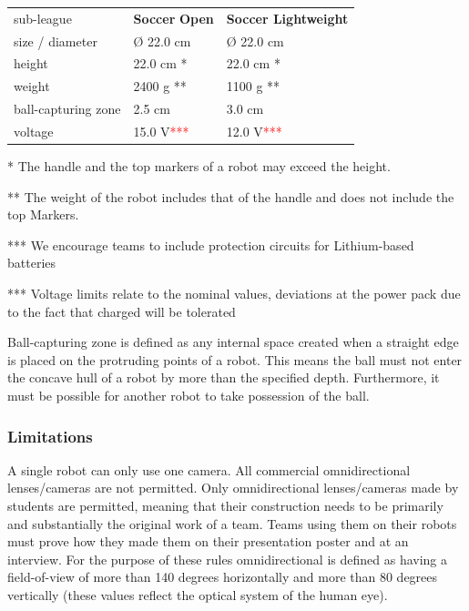 \documentclass{article}
\begin{document}
\begin{table}
\begin{tabularx}{\textwidth}{
p{}
p{}
p{}}
sub-league & \textbf{Soccer} \textbf{Open} & \textbf{Soccer Lightweight} \\
size / diameter & \O{} 22.0 cm & \O{} 22.0 cm \\
height & 22.0 cm * & 22.0 cm * \\
weight & 2400 g ** & 1100 g ** \\
ball-capturing zone & 2.5 cm & 3.0 cm \\
voltage & 15.0 V\textcolor{red}{***} & 12.0 V\textcolor{red}{***} \\

\end{tabularx}

\end{table}

* The handle and the top markers of a robot may exceed the height.

** The weight of the robot includes that of the handle and does not include the top Markers.

*** We encourage teams to include protection circuits for Lithium-based
batteries

*** Voltage limits relate to the nominal values, deviations at the power pack
due to the fact that charged will be tolerated

Ball-capturing zone is defined as any internal space created when a straight
edge is placed on the protruding points of a robot. This means the ball must
not enter the concave hull of a robot by more than the specified depth.
Furthermore, it must be possible for another robot to take possession of the
ball.

\subsubsection{Limitations\label{ref-056}}

A single robot can only use one camera. All commercial omnidirectional
lenses/cameras are not permitted. Only omnidirectional lenses/cameras made by
students are permitted, meaning that their construction needs to be primarily
and substantially the original work of a team. Teams using them on their robots
must prove how they made them on their presentation poster and at an interview.
For the purpose of these rules omnidirectional is defined as having a
field-of-view of more than 140 degrees horizontally and more than 80 degrees
vertically (these values reflect the optical system of the human eye).
\end{document}
